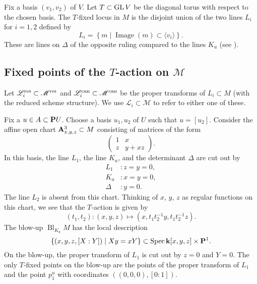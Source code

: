 \documentclass{amsart}
\renewcommand{\k}{\mathbf k}
\DeclareMathOperator{\Bl}{Bl}
\begin{document}
Fix a basis \((v_{1}, v_{2})\) of \(V\).
Let \(T \subset \GL V\) be the diagonal torus with respect to the chosen basis.
The \(T\)-fixed locus in \(M\) is the disjoint union of the two lines \(L_i\) for \(i = 1,2\) defined by
\[ L_i = \left\{ m \mid \operatorname{Image}(m) \subset \langle  v_i \rangle \right\}.\]
These are lines on \(\Delta\) of the opposite ruling compared to the lines \(K_u\) (see ).

\subsection{Fixed points of the \(T\)-action on \(\mathscr M\)}\label{sec:fp}
Let \(\mathscr L^{\rm res}_i \subset \mathscr M^{\rm res}\) and \(\mathscr L^{\rm can}_i \subset \mathscr M^{\rm can}\) be the proper transforms of \(L_i \subset M\) (with the reduced scheme structure).
We use \(\mathscr L_i \subset \mathscr M\) to refer to either one of these.

Fix a \(u \in A \subset \P U\).
Choose a basis \(u_1, u_2\) of \(U\) such that \(u = [u_2]\).
Consider the affine open chart \(\A_{x,y,z}^{3} \subset M\) consisting of matrices of the form
\[
  \begin{pmatrix}
    1 & x \\
    z & y + xz
  \end{pmatrix}.
\]
In this basis, the line \(L_1\), the line \(K_{u}\), and the determinant \(\Delta\) are cut out by
\begin{align*}
  L_{1} &: z = y = 0, \\
  K_{u} &: x = y = 0, \\
  \Delta &: y = 0.
\end{align*}
The line \(L_{2}\) is absent from this chart.
Thinking of \(x\), \(y\), \(z\) as regular functions on this chart, we see that the \(T\)-action is given by
\begin{equation}\label{eqn:t-action-chart}
  (t_1,t_2) \colon (x,y,z) \mapsto (x,t_1t_2^{-1}y, t_1t_2^{-1}z).
\end{equation}
The blow-up \(\Bl_{K_u} M\) has the local description
\[ \{(x,y,z,[X:Y]) \mid Xy=xY\} \subset \spec \k[x,y,z] \times \P^1.\]
On the blow-up, the proper transform of \(L_1\) is cut out by \(z = 0\) and \(Y = 0\).
The only \(T\)-fixed points on the blow-up are the points of the proper transform of \(L_1\) and the point \(p_1^u\) with coordinates \(((0,0,0),[0:1])\).
\end{document}
